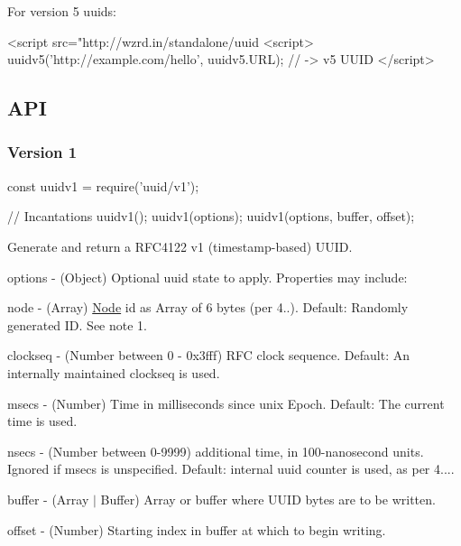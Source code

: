 For version 5 uuids\+:


\begin{DoxyCode}
<script src="http://wzrd.in/standalone/uuid%
<script>
uuidv5('http://example.com/hello', uuidv5.URL); // -> v5 UUID
</script>
\end{DoxyCode}


\subsection*{A\+PI}

\subsubsection*{Version 1}


\begin{DoxyCode}
const uuidv1 = require('uuid/v1');

// Incantations
uuidv1();
uuidv1(options);
uuidv1(options, buffer, offset);
\end{DoxyCode}


Generate and return a R\+F\+C4122 v1 (timestamp-\/based) U\+U\+ID.


\begin{DoxyItemize}
\item {\ttfamily options} -\/ (Object) Optional uuid state to apply. Properties may include\+:
\begin{DoxyItemize}
\item {\ttfamily node} -\/ (Array) \mbox{\hyperlink{classNode}{Node}} id as Array of 6 bytes (per 4..). Default\+: Randomly generated ID. See note 1.
\item {\ttfamily clockseq} -\/ (Number between 0 -\/ 0x3fff) R\+FC clock sequence. Default\+: An internally maintained clockseq is used.
\item {\ttfamily msecs} -\/ (Number) Time in milliseconds since unix Epoch. Default\+: The current time is used.
\item {\ttfamily nsecs} -\/ (Number between 0-\/9999) additional time, in 100-\/nanosecond units. Ignored if {\ttfamily msecs} is unspecified. Default\+: internal uuid counter is used, as per 4....
\end{DoxyItemize}
\item {\ttfamily buffer} -\/ (Array $\vert$ Buffer) Array or buffer where U\+U\+ID bytes are to be written.
\item {\ttfamily offset} -\/ (Number) Starting index in {\ttfamily buffer} at which to begin writing.
\end{DoxyItemize}

